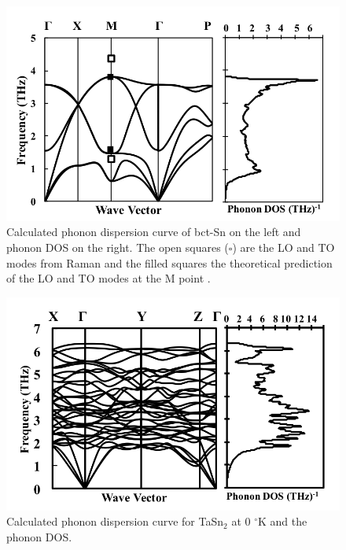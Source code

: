 \pagebreak
\begin{figure}[H]
	\centering
	\includegraphics[width=\textwidth]{Chapter-4/Figures/Snphonondos.png}
	\caption{Calculated phonon dispersion curve of bct-Sn on the left and phonon DOS on the right. The open squares ($\square$) are the LO and TO modes from Raman \cite{Olijnyk1992} and the filled squares the theoretical prediction of the LO and TO modes at the M point \cite{Olijnyk1992}.}
	\label{Ch4-figure:Snphonon}
\end{figure}

\pagebreak
\begin{figure}[H]
	\centering
	\includegraphics[width=\textwidth]{Chapter-4/Figures/TaSn2phonondos.png}
	\caption{Calculated phonon dispersion curve for TaSn$_2$ at 0 $^\circ$K and the phonon DOS.}
	\label{Ch4-figure:TaSn2phonon}
\end{figure}


